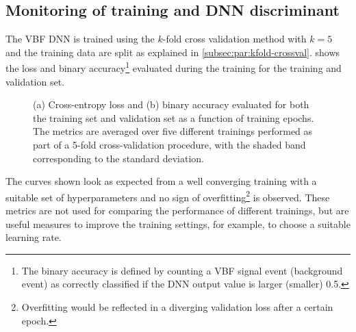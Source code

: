\subsection{Monitoring of training and DNN discriminant}
\label{subsec:performance-metrics}
The VBF DNN is trained using the $k$-fold cross validation method with $k=5$ and the training data are split as explained in \cref{subsec:par:kfold-crossval}.
 shows the loss and binary accuracy\footnote{The binary accuracy is defined by counting a VBF signal event (background event) as correctly classified if the DNN output value is larger (smaller) 0.5.
} evaluated during the training for the training and validation set.
\begin{figure}[ht]
    \caption{(a) Cross-entropy loss and (b) binary accuracy evaluated for both the training set and validation set as a function of training epochs. The metrics are averaged over five different trainings performed as part of a 5-fold cross-validation procedure, with the shaded band corresponding to the standard deviation.}
    \label{fig:monitoring}
\end{figure}
The curves shown look as expected from a well converging training with a suitable set of hyperparameters and no sign of overfitting\footnote{Overfitting would be reflected in a diverging validation loss after a certain epoch.} is observed. These metrics are not used for comparing the performance of different trainings, but are useful measures to improve the training settings, for example, to choose a suitable learning rate.  

